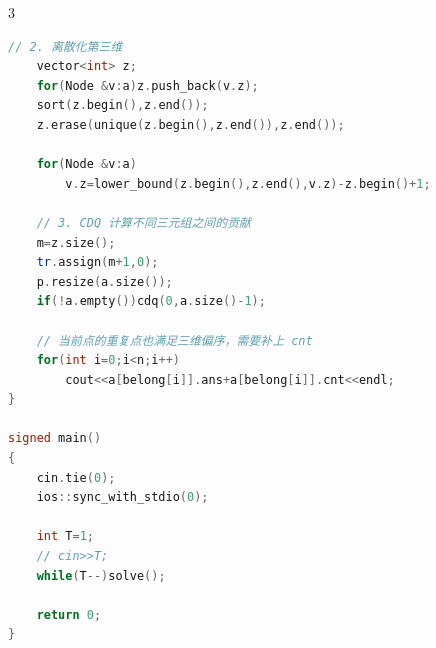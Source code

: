 \documentclass[10pt,landscape,a4paper]{article}
\begin{document}
\begin{multicols*}{3}
\begin{lstlisting}[language=C++]
    // 2. 离散化第三维
    vector<int> z;
    for(Node &v:a)z.push_back(v.z);
    sort(z.begin(),z.end());
    z.erase(unique(z.begin(),z.end()),z.end());

    for(Node &v:a)
        v.z=lower_bound(z.begin(),z.end(),v.z)-z.begin()+1;

    // 3. CDQ 计算不同三元组之间的贡献
    m=z.size();
    tr.assign(m+1,0);
    p.resize(a.size());
    if(!a.empty())cdq(0,a.size()-1);

    // 当前点的重复点也满足三维偏序，需要补上 cnt
    for(int i=0;i<n;i++)
        cout<<a[belong[i]].ans+a[belong[i]].cnt<<endl;
}

signed main()
{
    cin.tie(0);
    ios::sync_with_stdio(0);

    int T=1;
    // cin>>T;
    while(T--)solve();

    return 0;
}
\end{lstlisting}

\end{multicols*}
\end{document}
